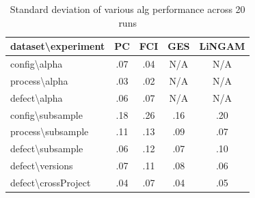 \documentclass[]{svjour3}
\begin{document}
\begin{table}[]
\centering
\caption{Standard deviation of various alg performance across 20 runs}
\label{alt std}
\begin{tabular}{|l|c|c|c|c|}
\hline
\textbf{dataset\textbackslash{}experiment} & \multicolumn{1}{l|}{\textbf{PC}} & \multicolumn{1}{l|}{\textbf{FCI}} & \multicolumn{1}{l|}{\textbf{GES}} & \multicolumn{1}{l|}{\textbf{LiNGAM}} \\ \hline
config\textbackslash{}alpha                & .07                              & .04                               & N/A                               & N/A                                  \\ \hline
process\textbackslash{}alpha               & \cellcolor[HTML]{FFCCC9}.03      & \cellcolor[HTML]{FFCCC9}.02       & N/A                               & N/A                                  \\ \hline
defect\textbackslash{}alpha                & \cellcolor[HTML]{9AFF99}.06     & \cellcolor[HTML]{9AFF99}.07       & N/A                               & N/A                                  \\ \hline
config\textbackslash{}subsample            & .18                              & \cellcolor[HTML]{9AFF99}.26       & \cellcolor[HTML]{9AFF99}.16      & \cellcolor[HTML]{9AFF99}.20          \\ \hline
process\textbackslash{}subsample           & \cellcolor[HTML]{FFCCC9}.11      & \cellcolor[HTML]{FFCCC9}.13       & \cellcolor[HTML]{FFCCC9}.09       & \cellcolor[HTML]{FFCCC9}.07          \\ \hline
defect\textbackslash{}subsample            & \cellcolor[HTML]{9AFF99}.06      & \cellcolor[HTML]{9AFF99}.12       & .07                               & .10                                  \\ \hline
defect\textbackslash{}versions             & .07                              & .11                               & .08                               & .06                                  \\ \hline
defect\textbackslash{}crossProject         & .04                              & .07                               & .04                             & .05                                  \\ \hline
\end{tabular}
\end{table}
\end{document}
